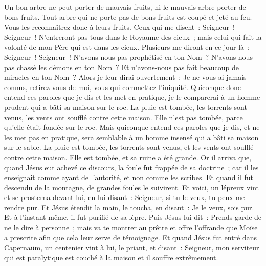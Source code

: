 \begin{multicols}{2}
Un bon arbre ne peut porter de mauvais fruits, ni le mauvais arbre porter de bons fruits.
Tout arbre qui ne porte pas de bons fruits est coupé et jeté au feu.
Vous les reconnaîtrez donc à leurs fruits.
Ceux qui me disent~: Seigneur~! Seigneur~! N'entreront pas tous dans le Royaume des cieux~; mais celui qui fait la volonté de mon Père qui est dans les cieux.
Plusieurs me diront en ce jour-là~: Seigneur~! Seigneur~! N'avons-nous pas prophétisé en ton Nom~? N'avons-nous pas chassé les démons en ton Nom~? Et n'avons-nous pas fait beaucoup de miracles en ton Nom~?
Alors je leur dirai ouvertement~: Je ne vous ai jamais connus, retirez-vous de moi, vous qui commettez l'iniquité.
Quiconque donc entend ces paroles que je dis et les met en pratique, je le comparerai à un homme prudent qui a bâti sa maison sur le roc.
La pluie est tombée, les torrents sont venus, les vents ont soufflé contre cette maison. Elle n'est pas tombée, parce qu'elle était fondée sur le roc.
Mais quiconque entend ces paroles que je dis, et ne les met pas en pratique, sera semblable à un homme insensé qui a bâti sa maison sur le sable.
La pluie est tombée, les torrents sont venus, et les vents ont soufflé contre cette maison. Elle est tombée, et sa ruine a été grande.
Or il arriva que, quand Jésus eut achevé ce discours, la foule fut frappée de sa doctrine~;
car il les enseignait comme ayant de l'autorité, et non comme les scribes.
\VerseOne{}Et quand il fut descendu de la montagne, de grandes foules le suivirent.
Et voici, un lépreux vint et se prosterna devant lui, en lui disant~: Seigneur, si tu le veux, tu peux me rendre pur.
Et Jésus étendit la main, le toucha, en disant~: Je le veux, sois pur. Et à l'instant même, il fut purifié de sa lèpre.
Puis Jésus lui dit~: Prends garde de ne le dire à personne~; mais va te montrer au prêtre et offre l'offrande que Moïse a prescrite afin que cela leur serve de témoignage.
Et quand Jésus fut entré dans Capernaüm, un centenier vint à lui, le priant,
et disant~: Seigneur, mon serviteur qui est paralytique est couché à la maison et il souffre extrêmement.

\end{multicols}

